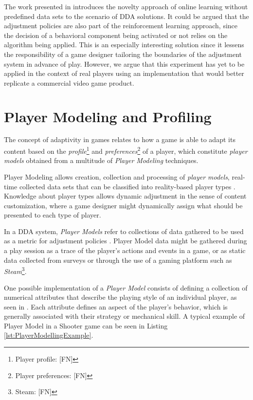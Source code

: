 \documentclass[cic,tc,english]{iiufrgs}
\begin{document}
The work presented in \cite{article_adaptivebehaviorai} introduces the novelty approach of online learning without predefined data sets to the scenario of DDA solutions. It could be argued that the adjustment policies are also part of the reinforcement learning approach, since the decision of a behavioral component being activated or not relies on the algorithm being applied. This is an especially interesting solution since it lessens the responsibility of a game designer tailoring the boundaries of the adjustment system in advance of play. However, we argue that this experiment has yet to be applied in the context of real players using an implementation that would better replicate a commercial video game product.

\section{Player Modeling and Profiling}

The concept of adaptivity in games relates to how a game is able to adapt its content based on the \emph{profile}\footnote{Player profile: [FN]} and \emph{preferences}\footnote{Player preferences: [FN]} of a player, which constitute \emph{player models} obtained from a multitude of \emph{Player Modeling} techniques.

Player Modeling allows creation, collection and processing of \emph{player models}, real-time collected data sets that can be classified into reality-based player types \cite{ARTICLE_DynamicPlayerModelling}. Knowledge about player types allows dynamic adjustment in the sense of content customization, where a game designer might dynamically assign what should be presented to each type of player.

In a DDA system, \emph{Player Models} refer to collections of data gathered to be used as a metric for adjustment policies \cite{PHD_DynamicDifficultyAdjustment}. Player Model data might be gathered during a play session as a trace of the player's actions and events in a game, or as static data collected from surveys or through the use of a gaming platform such as \emph{Steam}\footnote{Steam: [FN]}.

One possible implementation of a \emph{Player Model} consists of defining a collection of numerical attributes that describe the playing style of an individual player, as seen in \cite{BOOK_PlayerModeling}. Each attribute defines an aspect of the player's behavior, which is generally associated with their strategy or mechanical skill. A typical example of Player Model in a Shooter game can be seen in Listing \ref{lst:PlayerModellingExample}.
\end{document}
